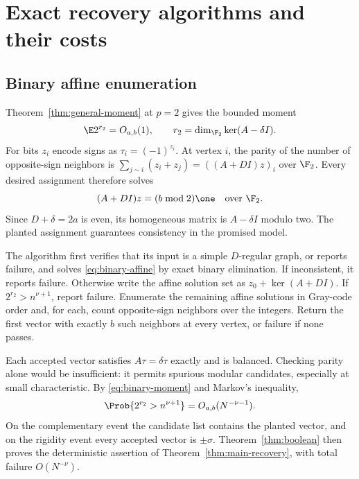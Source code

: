 \section{Exact recovery algorithms and their costs}\label{sec:enumeration}

\subsection{Binary affine enumeration}
Theorem~\ref{thm:general-moment} at $p=2$ gives the bounded moment
\begin{equation}\label{eq:binary-moment}
 \E 2^{r_2}=O_{a,b}(1),\qquad
 r_2=\dim_{\F_2}\ker(A-\delta I).
\end{equation}
For bits $z_i$ encode signs as $\tau_i=(-1)^{z_i}$. At vertex $i$,
the parity of the number of opposite-sign neighbors is
$\sum_{j\sim i}(z_i+z_j)=((A+DI)z)_i$ over $\F_2$.
Every desired assignment therefore solves
\begin{equation}\label{eq:binary-affine}
 (A+DI)z=(b\bmod2)\one\quad\text{over }\F_2.
\end{equation}
Since $D+\delta=2a$ is even, its homogeneous matrix is
$A-\delta I$ modulo two. The planted assignment guarantees consistency
in the promised model.

The algorithm first verifies that its input is a simple $D$-regular
graph, or reports failure, and solves \eqref{eq:binary-affine} by exact
binary elimination. If inconsistent, it reports failure. Otherwise
write the affine solution set as $z_0+\ker(A+DI)$.
If $2^{r_2}>n^{\nu+1}$, report failure. Enumerate the remaining affine
solutions in Gray-code order and, for each, count opposite-sign
neighbors over the integers. Return the first vector with exactly
$b$ such neighbors at every vertex, or failure if none passes.

Each accepted vector satisfies $A\tau=\delta\tau$ exactly and is
balanced. Checking parity alone would be insufficient: it permits
spurious modular candidates, especially at small characteristic.
By \eqref{eq:binary-moment} and Markov's inequality,
\begin{equation}\label{eq:cutoff-prob}
 \Prob\{2^{r_2}>n^{\nu+1}\}=O_{a,b}(N^{-\nu-1}).
\end{equation}
On the complementary event the candidate list contains the planted vector, and on
the rigidity event every accepted vector is $\pm\sigma$.
Theorem~\ref{thm:boolean} then proves the deterministic assertion
of Theorem~\ref{thm:main-recovery}, with total failure $O(N^{-\nu})$.

